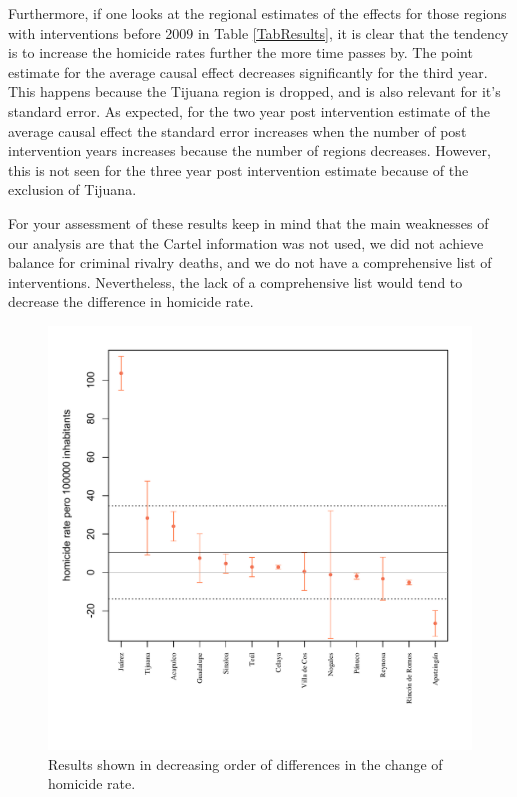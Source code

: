\documentclass{article}[11 pt]
\begin{document}
Furthermore, if one looks at the regional estimates of the effects for those regions with interventions before 2009 in Table \ref{TabResults}, it is clear that the tendency is to increase the homicide rates further the more time passes by. The point estimate for the average causal effect decreases significantly for the third year. This happens because the Tijuana region is dropped, and is also relevant for it's standard error. As expected, for the two year post intervention estimate of the average causal effect the standard error increases when the number of post intervention years increases because the number of regions decreases. However, this is not seen for the three year post intervention estimate because of the exclusion of Tijuana.


For your assessment of these results keep in mind that the main weaknesses of our analysis are that the Cartel information was not used, we did not achieve balance for criminal rivalry deaths, and we do not have a comprehensive list of interventions. Nevertheless, the lack of a comprehensive list would tend to decrease the difference in homicide rate. %
 
\begin{figure}[htdp]
	\centering
  \includegraphics[scale=0.5]{Images/results.pdf}
  \caption{Results shown in decreasing order of differences in the change of homicide rate.}
\label{figResults}
\end{figure}
\end{document}
